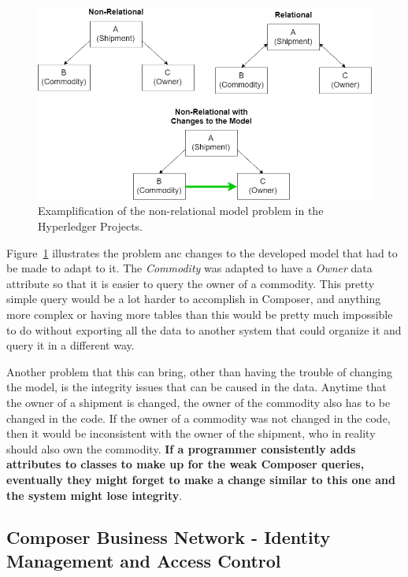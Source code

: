 \begin{figure}[h]
    \centering
    \includegraphics[scale=0.40]{media/relational_problem.png}
    \caption[Examplification of the non-relational model problem in the Hyperledger Projects.]{Examplification of the non-relational model problem in the Hyperledger Projects.}
    \label{fig:relational_problem}
\end{figure}
Figure~\ref{fig:relational_problem} illustrates the problem anc changes to the developed model that had to be made to adapt to it. The \textit{Commodity} was adapted to have a \textit{Owner} data attribute so that it is easier to query the owner of a commodity. This pretty simple query would be a lot harder to accomplish in Composer, and anything more complex or having more tables than this would be pretty much impossible to do without exporting all the data to another system that could organize it and query it in a different way. 

Another problem that this can bring, other than having the trouble of changing the model, is the integrity issues that can be caused in the data. Anytime that the owner of a shipment is changed, the owner of the commodity also has to be changed in the code. If the owner of a commodity was not changed in the code, then it would be inconsistent with the owner of the shipment, who in reality should also own the commodity. \textbf{If a programmer consistently adds attributes to classes to make up for the weak Composer queries, eventually they might forget to make a change similar to this one and the system might lose integrity}.


\subsection{Composer Business Network - Identity Management and Access Control}

